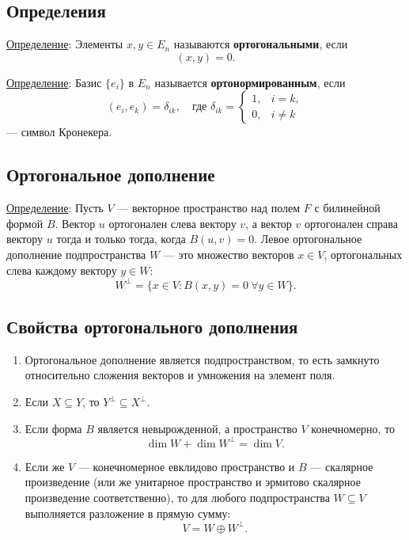 \documentclass[12pt]{article}
\begin{document}
\subsection*{Определения}
\underline{Определение}: Элементы $x, y \in E_n$ называются \textbf{ортогональными}, если  
$$
(x, y) = 0.
$$

\underline{Определение}: Базис $\{e_i\}$ в $E_n$ называется \textbf{ортонормированным}, если  
$$
(e_i, e_k) = \delta_{ik}, \quad \text{где } \delta_{ik} = 
\begin{cases} 
1, & i = k, \\ 
0, & i \neq k 
\end{cases}
$$
— символ Кронекера.

\subsection*{Ортогональное дополнение}
\underline{Определение}: Пусть $V$ — векторное пространство над полем $F$ с билинейной формой $B$. Вектор $u$ ортогонален слева вектору $v$, а вектор $v$ ортогонален справа вектору $u$ тогда и только тогда, когда $B(u, v) = 0$. Левое ортогональное дополнение подпространства $W$ — это множество векторов $x \in V$, ортогональных слева каждому вектору $y \in W$:
$$
W^\perp = \{x \in V : B(x, y) = 0 \ \forall y \in W\}.
$$

\subsection*{Свойства ортогонального дополнения}

\begin{enumerate}
    \item Ортогональное дополнение является подпространством, то есть замкнуто относительно сложения векторов и умножения на элемент поля.
    \item Если $X \subseteq Y$, то $Y^\perp \subseteq X^\perp$.
    \item Если форма $B$ является невырожденной, а пространство $V$ конечномерно, то  
    $$
    \dim W + \dim W^\perp = \dim V.
    $$
    \item Если же $V$ — конечномерное евклидово пространство и $B$ — скалярное произведение (или же унитарное пространство и эрмитово скалярное произведение соответственно), то для любого подпространства $W \subseteq V$ выполняется разложение в прямую сумму:
    $$
    V = W \oplus W^\perp.
    $$
\end{enumerate}
\end{document}

